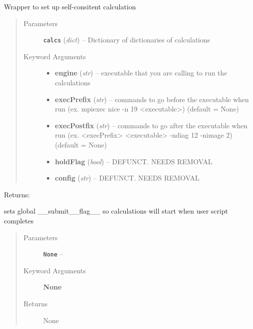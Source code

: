 \documentclass[letterpaper,10pt,english]{sphinxmanual}
\begin{document}
\begin{fulllineitems}
\label{run:run.scf}
Wrapper to set up self-consitent calculation
\begin{quote}\begin{description}
\item[{Parameters}] \leavevmode
\textbf{\texttt{calcs}} (\emph{dict}) -- Dictionary of dictionaries of calculations

\item[{Keyword Arguments}] \leavevmode\begin{itemize}
\item {} 
\textbf{engine} (\emph{str}) --
executable that you are calling to run the calculations

\item {} 
\textbf{execPrefix} (\emph{str}) --
commands to go before the executable when run
(ex. mpiexec nice -n 19 \textless{}executable\textgreater{}) (default = None)

\item {} 
\textbf{execPostfix} (\emph{str}) --
commands to go after the executable when run
(ex. \textless{}execPrefix\textgreater{} \textless{}executable\textgreater{} -ndiag 12 -nimage 2) (default = None)

\item {} 
\textbf{holdFlag} (\emph{bool}) --
DEFUNCT. NEEDS REMOVAL

\item {} 
\textbf{config} (\emph{str}) --
DEFUNCT. NEEDS REMOVAL

\end{itemize}

\end{description}\end{quote}

Returns:

\end{fulllineitems}


\begin{fulllineitems}
\label{run:run.submit}
sets global \_\_submit\_\_flag\_\_ so calculations will start when user script completes
\begin{quote}\begin{description}
\item[{Parameters}] \leavevmode
\textbf{\texttt{None}} -- 

\item[{Keyword Arguments}] \leavevmode
\textbf{None}

\item[{Returns}] \leavevmode
None

\end{description}\end{quote}

\end{fulllineitems}
\end{document}
